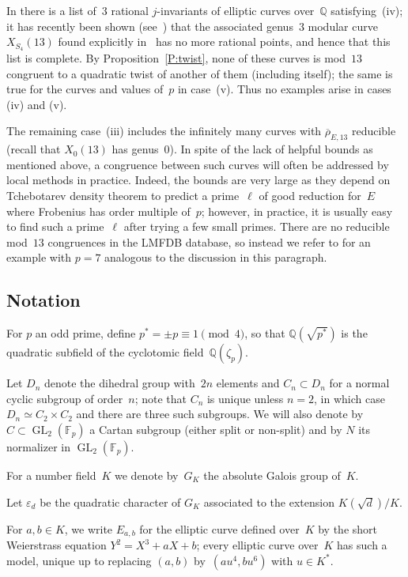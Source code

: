 \documentclass[12pt, reqno]{amsart}
\newcommand{\F}{\mathbb{F}}
\newcommand{\Q}{\mathbb{Q}}
\newcommand{\rhobar}{{\overline{\rho}}}
\newcommand{\eps}{\varepsilon}
\newcommand{\GL}{\operatorname{GL}}
\numberwithin{equation}{section}
\theoremstyle{definition}
\theoremstyle{remark}
\begin{document}
In \cite[Corollary~1.9]{BarinderCrem} there is a list of~$3$ rational
$j$-invariants of elliptic curves over~$\Q$ satisfying~(iv); it has
recently been shown (see~\cite{BDMTV-S4}) that the associated
genus~$3$ modular curve~$X_{S_4}(13)$ found explicitly
in~\cite{BarinderCrem} has no more rational points, and hence that
this list is complete. By Proposition~\ref{P:twist}, none of these
curves is mod~$13$ congruent to a quadratic twist of another of them
(including itself); the same is true for the curves and values of~$p$
in case~(v). Thus no examples arise in cases (iv) and (v).

The remaining case~(iii) includes the infinitely many curves with
$\rhobar_{E,13}$ reducible (recall that $X_0(13)$ has genus~0). In
spite of the lack of helpful bounds as mentioned above, a congruence
between such curves will often be addressed by local methods in
practice. Indeed, the bounds are very large as they depend on
Tchebotarev density theorem to predict a prime~$\ell$ of good
reduction for~$E$ where Frobenius has order multiple of~$p$; however,
in practice, it is usually easy to find such a prime~$\ell$ after
trying a few small primes.  There are no reducible mod~$13$ congruences in the LMFDB database, so instead we refer to \cite[Example~31.2]{FKSym} for
an example with $p=7$ analogous to the discussion in this paragraph.

\subsection{Notation} \label{S:notation}
For $p$ an odd prime, define $p^*=\pm p\equiv1\pmod4$, so that
$\Q(\sqrt{p^*})$ is the quadratic subfield of the cyclotomic
field~$\Q(\zeta_p)$.

Let $D_{n}$ denote the dihedral group with~$2n$ elements and $C_n
\subset D_{n}$ for a normal cyclic subgroup of order~$n$; note that
$C_n$ is unique unless $n=2$, in which case $D_{n} \simeq C_2 \times
C_2$ and there are three such subgroups.  We will also denote by $C
\subset \GL_2(\F_p)$ a Cartan subgroup (either split or non-split) and
by $N$ its normalizer in $\GL_2(\F_p)$.

For a number field~$K$ we denote by~$G_K$ the absolute Galois group
of~$K$.

Let $\eps_d$ be the quadratic character of $G_K$ associated to the
extension $K(\sqrt{d})/K$.

For $a, b \in K$, we write $E_{a,b}$ for the elliptic
curve defined over~$K$ by the short Weierstrass equation
$Y^2=X^3+aX+b$; every elliptic curve over~$K$ has such a model, unique
up to replacing $(a,b)$ by~$(au^4,bu^6)$ with $u\in K^*$.
\end{document}
